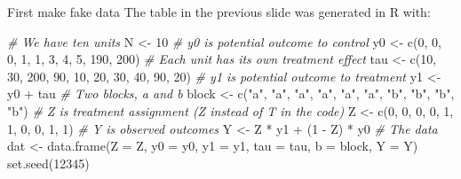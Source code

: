 \documentclass[
  ignorenonframetext,
]{beamer}
\newenvironment{Shaded}{\begin{snugshade}}{\end{snugshade}}
\newcommand{\AttributeTok}[1]{\textcolor[rgb]{0.77,0.63,0.00}{#1}}
\newcommand{\CommentTok}[1]{\textcolor[rgb]{0.56,0.35,0.01}{\textit{#1}}}
\newcommand{\DecValTok}[1]{\textcolor[rgb]{0.00,0.00,0.81}{#1}}
\newcommand{\FunctionTok}[1]{\textcolor[rgb]{0.00,0.00,0.00}{#1}}
\newcommand{\NormalTok}[1]{#1}
\newcommand{\OtherTok}[1]{\textcolor[rgb]{0.56,0.35,0.01}{#1}}
\newcommand{\SpecialCharTok}[1]{\textcolor[rgb]{0.00,0.00,0.00}{#1}}
\newcommand{\StringTok}[1]{\textcolor[rgb]{0.31,0.60,0.02}{#1}}
\begin{document}
\begin{frame}[fragile]{First make fake data}
\protect\hypertarget{first-make-fake-data}{}
The table in the previous slide was generated in R with:

\scriptsize

\begin{Shaded}
\begin{Highlighting}[]
\CommentTok{\# We have ten units}
\NormalTok{N }\OtherTok{\textless{}{-}} \DecValTok{10}
\CommentTok{\#  y0 is potential outcome to control}
\NormalTok{y0 }\OtherTok{\textless{}{-}} \FunctionTok{c}\NormalTok{(}\DecValTok{0}\NormalTok{, }\DecValTok{0}\NormalTok{, }\DecValTok{0}\NormalTok{, }\DecValTok{1}\NormalTok{, }\DecValTok{1}\NormalTok{, }\DecValTok{3}\NormalTok{, }\DecValTok{4}\NormalTok{, }\DecValTok{5}\NormalTok{, }\DecValTok{190}\NormalTok{, }\DecValTok{200}\NormalTok{)}
\CommentTok{\# Each unit has its own treatment effect}
\NormalTok{tau }\OtherTok{\textless{}{-}} \FunctionTok{c}\NormalTok{(}\DecValTok{10}\NormalTok{, }\DecValTok{30}\NormalTok{, }\DecValTok{200}\NormalTok{, }\DecValTok{90}\NormalTok{, }\DecValTok{10}\NormalTok{, }\DecValTok{20}\NormalTok{, }\DecValTok{30}\NormalTok{, }\DecValTok{40}\NormalTok{, }\DecValTok{90}\NormalTok{, }\DecValTok{20}\NormalTok{)}
\CommentTok{\# y1 is potential outcome to treatment}
\NormalTok{y1 }\OtherTok{\textless{}{-}}\NormalTok{ y0 }\SpecialCharTok{+}\NormalTok{ tau}
\CommentTok{\# Two blocks, a and b}
\NormalTok{block }\OtherTok{\textless{}{-}} \FunctionTok{c}\NormalTok{(}\StringTok{"a"}\NormalTok{, }\StringTok{"a"}\NormalTok{, }\StringTok{"a"}\NormalTok{, }\StringTok{"a"}\NormalTok{, }\StringTok{"a"}\NormalTok{, }\StringTok{"a"}\NormalTok{, }\StringTok{"b"}\NormalTok{, }\StringTok{"b"}\NormalTok{, }\StringTok{"b"}\NormalTok{, }\StringTok{"b"}\NormalTok{)}
\CommentTok{\# Z is treatment assignment (Z instead of T in the code)}
\NormalTok{Z }\OtherTok{\textless{}{-}} \FunctionTok{c}\NormalTok{(}\DecValTok{0}\NormalTok{, }\DecValTok{0}\NormalTok{, }\DecValTok{0}\NormalTok{, }\DecValTok{0}\NormalTok{, }\DecValTok{1}\NormalTok{, }\DecValTok{1}\NormalTok{, }\DecValTok{0}\NormalTok{, }\DecValTok{0}\NormalTok{, }\DecValTok{1}\NormalTok{, }\DecValTok{1}\NormalTok{)}
\CommentTok{\# Y is observed outcomes}
\NormalTok{Y }\OtherTok{\textless{}{-}}\NormalTok{ Z }\SpecialCharTok{*}\NormalTok{ y1 }\SpecialCharTok{+}\NormalTok{ (}\DecValTok{1} \SpecialCharTok{{-}}\NormalTok{ Z) }\SpecialCharTok{*}\NormalTok{ y0}
\CommentTok{\# The data}
\NormalTok{dat }\OtherTok{\textless{}{-}} \FunctionTok{data.frame}\NormalTok{(}\AttributeTok{Z =}\NormalTok{ Z, }\AttributeTok{y0 =}\NormalTok{ y0, }\AttributeTok{y1 =}\NormalTok{ y1, }\AttributeTok{tau =}\NormalTok{ tau, }\AttributeTok{b =}\NormalTok{ block, }\AttributeTok{Y =}\NormalTok{ Y)}
\FunctionTok{set.seed}\NormalTok{(}\DecValTok{12345}\NormalTok{)}
\end{Highlighting}
\end{Shaded}

\normalsize
\end{frame}
\end{document}
